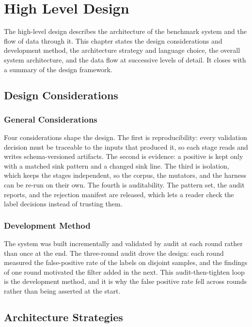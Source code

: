 \chapter{High Level Design}
\label{ch:hld}

The high-level design describes the architecture of the benchmark system and the
flow of data through it. This chapter states the design considerations and
development method, the architecture strategy and language choice, the overall
system architecture, and the data flow at successive levels of detail. It closes
with a summary of the design framework.


\section{Design Considerations}

\subsection{General Considerations}

Four considerations shape the design. The first is reproducibility: every
validation decision must be traceable to the inputs that produced it, so each
stage reads and writes schema-versioned artifacts. The second is evidence: a
positive is kept only with a matched sink pattern and a changed sink line. The
third is isolation, which keeps the stages independent, so the corpus, the
mutators, and the harness can be re-run on their own. The fourth is
auditability. The pattern set, the audit reports, and the rejection manifest are
released, which lets a reader check the label decisions instead of trusting
them.

\subsection{Development Method}

The system was built incrementally and validated by audit at each round rather
than once at the end. The three-round audit drove the design: each round
measured the false-positive rate of the labels on disjoint samples, and the
findings of one round motivated the filter added in the next. This
audit-then-tighten loop is the development method, and it is why the false
positive rate fell across rounds rather than being asserted at the start.

\section{Architecture Strategies}

